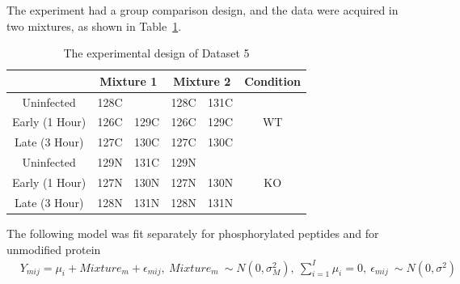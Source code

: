 \documentclass{mcp}
\begin{document}
The experiment had a group comparison design, and the data were acquired in two mixtures, as shown in Table~\ref{table:shigella_design}.

\begin{table}[h!]
\centering
\begin{tabular}{|c | c c | c c | c|}
\hline
 & \multicolumn{2}{c}{Mixture 1} & \multicolumn{2}{c}{Mixture 2} & Condition \\ [0.5ex]
 \hline\hline
 Uninfected & 128C & & 128C & 131C & \\
 \hline
Early (1 Hour) & 126C & 129C & 126C & 129C & WT \\
\hline
Late (3 Hour) & 127C & 130C & 127C & 130C & \\
\hline
Uninfected & 129N & 131C & 129N & & \\
\hline
Early (1 Hour) & 127N & 130N & 127N & 130N & KO \\
\hline
Late (3 Hour) & 128N & 131N & 128N & 131N & \\
\hline
\end{tabular}
\caption{The experimental design of Dataset 5}
\label{table:shigella_design}
\end{table}
The following model was fit separately for phosphorylated peptides and for unmodified protein 
\begin{eqnarray*}
& Y_{mij} = \mu_i + Mixture_m + \epsilon_{mij},\ Mixture_m ~ \sim N(0, \sigma^2_M) ,\  \sum_{i=1}^I{\mu_i} = 0 ,\ \epsilon_{mij} ~ \sim N(0, \sigma^2)&
\end{eqnarray*}
\end{document}
